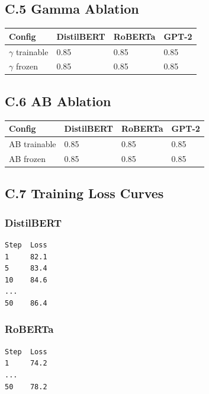\subsection{C.5 Gamma Ablation}

\begin{table}[H]
\centering
\small
\begin{tabular}{llll}
\toprule
\textbf{Config} & \textbf{DistilBERT} & \textbf{RoBERTa} & \textbf{GPT-2} \\
\midrule
$\gamma$ trainable & 0.85 & 0.85 & 0.85 \\
$\gamma$ frozen & 0.85 & 0.85 & 0.85 \\
\bottomrule
\end{tabular}
\end{table}

\subsection{C.6 AB Ablation}

\begin{table}[H]
\centering
\small
\begin{tabular}{llll}
\toprule
\textbf{Config} & \textbf{DistilBERT} & \textbf{RoBERTa} & \textbf{GPT-2} \\
\midrule
AB trainable & 0.85 & 0.85 & 0.85 \\
AB frozen & 0.85 & 0.85 & 0.85 \\
\bottomrule
\end{tabular}
\end{table}

\subsection{C.7 Training Loss Curves}

\subsubsection{DistilBERT}

\begin{lstlisting}
Step  Loss
1     82.1
5     83.4
10    84.6
...
50    86.4
\end{lstlisting}

\subsubsection{RoBERTa}

\begin{lstlisting}
Step  Loss
1     74.2
...
50    78.2
\end{lstlisting}

